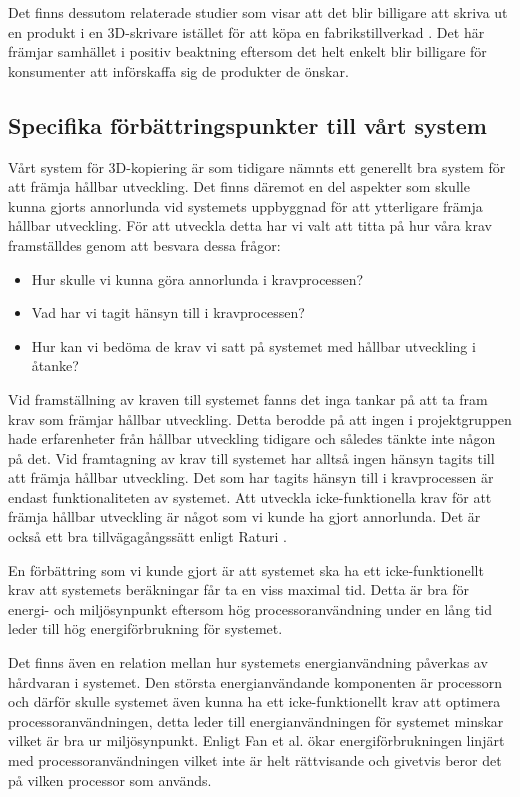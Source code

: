 Det finns dessutom relaterade studier som visar att det blir billigare att skriva ut en produkt i en 3D-skrivare istället för att köpa en fabrikstillverkad \cite{wittbrodt2013life}. Det här främjar samhället i positiv beaktning eftersom det helt enkelt blir billigare för konsumenter att införskaffa sig de produkter de önskar. 

\subsection{Specifika förbättringspunkter till vårt system}
Vårt system för 3D-kopiering är som tidigare nämnts ett generellt bra system för att främja hållbar utveckling. Det finns däremot en del aspekter som skulle kunna gjorts annorlunda vid systemets uppbyggnad för att ytterligare främja hållbar utveckling. För att utveckla detta har vi valt att titta på hur våra krav framställdes genom att besvara dessa frågor:

\begin{itemize}
	\item Hur skulle vi kunna göra annorlunda i kravprocessen?
	\item Vad har vi tagit hänsyn till i kravprocessen?
	\item Hur kan vi bedöma de krav vi satt på systemet med hållbar utveckling i åtanke?
\end{itemize}
Vid framställning av kraven till systemet fanns det inga tankar på att ta fram krav som främjar hållbar utveckling. Detta berodde på att ingen i projektgruppen hade erfarenheter från hållbar utveckling tidigare och således tänkte inte någon på det. Vid framtagning av krav till systemet har alltså ingen hänsyn tagits till att främja hållbar utveckling. Det som har tagits hänsyn till i kravprocessen är endast funktionaliteten av systemet. Att utveckla icke-funktionella krav för att främja hållbar utveckling är något som vi kunde ha gjort annorlunda. Det är också ett bra tillvägagångssätt enligt Raturi \cite{raturi2014developing}. 

En förbättring som vi kunde gjort är att systemet ska ha ett icke-funktionellt krav att systemets beräkningar får ta en viss maximal tid. Detta är bra för energi- och miljösynpunkt eftersom hög processoranvändning under en lång tid leder till hög energiförbrukning för systemet.

Det finns även en relation mellan hur systemets energianvändning påverkas av hårdvaran i systemet. Den största energianvändande komponenten är processorn och därför skulle systemet även kunna ha ett icke-funktionellt krav att optimera processoranvändningen, detta leder till energianvändningen för systemet minskar vilket är bra ur miljösynpunkt. Enligt Fan et al. \cite{fan2007power} ökar energiförbrukningen linjärt med processoranvändningen vilket inte är helt rättvisande och givetvis beror det på vilken processor som används. 

